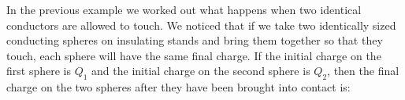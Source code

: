       \label{m38781*eip-89}In the previous example we worked out what happens when two identical conductors are allowed to touch. We noticed that if we take two identically sized conducting spheres on insulating stands and bring them together so that they touch, each sphere will have the same final charge. If the initial charge on the first sphere is \begin{math}{Q}_{1}\end{math} and the initial charge on the second sphere is \begin{math}{Q}_{2}\end{math}, then the final charge on the two spheres after they have been brought into contact is:
\label{m38781*id6214}\nopagebreak\noindent{}
    
\par \par
            \label{m38781*eip-918}\vspace{.5cm} 
      
